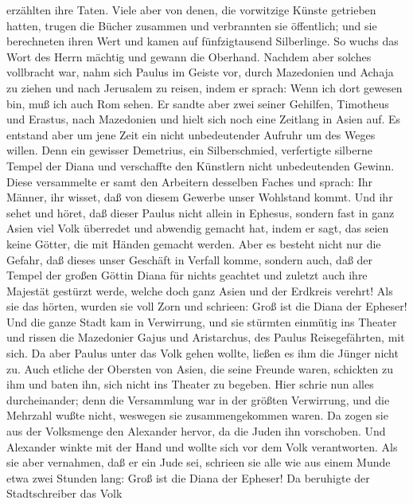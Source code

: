 erzählten ihre Taten.  Viele aber von denen, die
vorwitzige Künste getrieben hatten, trugen die Bücher zusammen und
verbrannten sie öffentlich; und sie berechneten ihren Wert und kamen auf
fünfzigtausend Silberlinge.  So wuchs das Wort des Herrn
mächtig und gewann die Oberhand.  Nachdem aber solches
vollbracht war, nahm sich Paulus im Geiste vor, durch Mazedonien und
Achaja zu ziehen und nach Jerusalem zu reisen, indem er sprach: Wenn ich
dort gewesen bin, muß ich auch Rom sehen.  Er sandte aber
zwei seiner Gehilfen, Timotheus und Erastus, nach Mazedonien und hielt
sich noch eine Zeitlang in Asien auf.  Es entstand aber
um jene Zeit ein nicht unbedeutender Aufruhr um des Weges willen.
 Denn ein gewisser Demetrius, ein Silberschmied,
verfertigte silberne Tempel der Diana und verschaffte den Künstlern
nicht unbedeutenden Gewinn.  Diese versammelte er samt
den Arbeitern desselben Faches und sprach: Ihr Männer, ihr wisset, daß
von diesem Gewerbe unser Wohlstand kommt.  Und ihr sehet
und höret, daß dieser Paulus nicht allein in Ephesus, sondern fast in
ganz Asien viel Volk überredet und abwendig gemacht hat, indem er sagt,
das seien keine Götter, die mit Händen gemacht werden. 
Aber es besteht nicht nur die Gefahr, daß dieses unser Geschäft in
Verfall komme, sondern auch, daß der Tempel der großen Göttin Diana für
nichts geachtet und zuletzt auch ihre Majestät gestürzt werde, welche
doch ganz Asien und der Erdkreis verehrt!  Als sie das
hörten, wurden sie voll Zorn und schrieen: Groß ist die Diana der
Epheser!  Und die ganze Stadt kam in Verwirrung, und sie
stürmten einmütig ins Theater und rissen die Mazedonier Gajus und
Aristarchus, des Paulus Reisegefährten, mit sich.  Da
aber Paulus unter das Volk gehen wollte, ließen es ihm die Jünger nicht
zu.  Auch etliche der Obersten von Asien, die seine
Freunde waren, schickten zu ihm und baten ihn, sich nicht ins Theater zu
begeben.  Hier schrie nun alles durcheinander; denn die
Versammlung war in der größten Verwirrung, und die Mehrzahl wußte nicht,
weswegen sie zusammengekommen waren.  Da zogen sie aus
der Volksmenge den Alexander hervor, da die Juden ihn vorschoben. Und
Alexander winkte mit der Hand und wollte sich vor dem Volk verantworten.
 Als sie aber vernahmen, daß er ein Jude sei, schrieen
sie alle wie aus einem Munde etwa zwei Stunden lang: Groß ist die Diana
der Epheser!  Da beruhigte der Stadtschreiber das Volk
